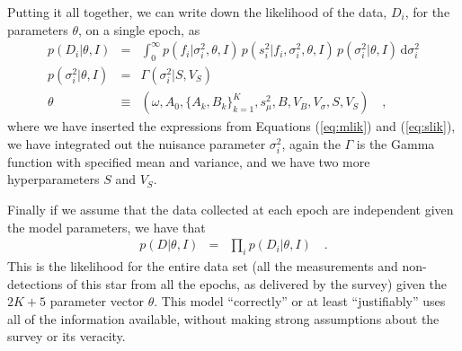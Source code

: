 \documentclass[12pt,preprint]{aastex}
\newcommand{\dd}{\mathrm{d}}
\newcommand{\fobs}{f_i}
\newcommand{\sobs}{s^2_i}
\begin{document}
Putting it all together, we can write down the likelihood of the data, $D_i$, for the parameters $\theta$, on a single epoch, as
\begin{eqnarray}\displaystyle
p(D_i|\theta,I) &=& \int_0^{\infty} p(\fobs |\sigma^2_i,\theta,I)\, p(\sobs | \fobs, \sigma^2_i,\theta,I)\, p(\sigma^2_i | \theta, I)\,\dd \sigma^2_i
\\
p(\sigma^2_i|\theta, I) &=& \Gamma(\sigma^2_i | S, V_S)
\\
\theta &\equiv& (\omega, A_0, \{A_k, B_k\}_{k=1}^K, s^2_\mu, B, V_B, V_{\sigma}, S, V_S) \quad ,
\end{eqnarray}
where we have inserted the expressions from Equations (\ref{eq:mlik}) and (\ref{eq:slik}), we have integrated out the nuisance parameter $\sigma^2_i$, again the $\Gamma$ is the Gamma function with specified mean and variance, and we have two more hyperparameters $S$ and $V_S$.

Finally if we assume that the data collected at each epoch are independent given the model parameters, we have that
\begin{eqnarray}\displaystyle
p(D|\theta,I) &=& \prod_i p(D_i|\theta,I)
\quad.
\end{eqnarray}
This is the likelihood for the entire
data set (all the measurements and non-detections of this star from
all the epochs, as delivered by the survey) given the $2K + 5$ parameter vector $\theta$.  This model
``correctly'' or at least ``justifiably'' uses all of the information
available, without making strong assumptions about the survey or its
veracity.
\end{document}
